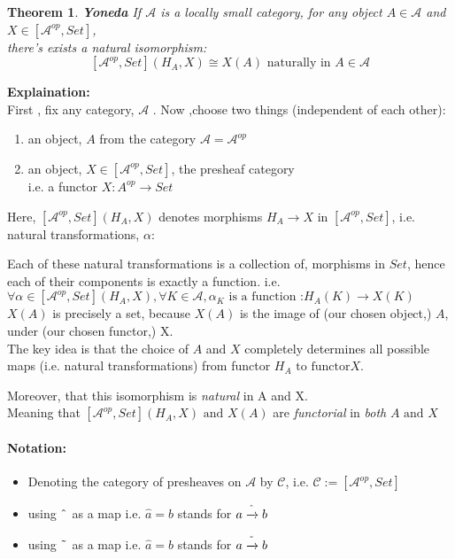 \documentclass[18pt,a4paper]{article}
\newtheorem{theorem}{Theorem}[section]
\theoremstyle{definition}
\begin{document}
\begin{theorem}{\textbf{Yoneda}} %
	If $\mathcal{A} $ is a locally small category, for any object $A \in \mathcal{A} $
	and $X \in [ \mathcal{A}^{op},Set]$,\\ there's exists a natural isomorphism:
	\[ [ \mathcal{A} ^{op},Set ](H_A,X) \cong X(A) \text{ naturally in } A \in \mathcal{A} \]
\end{theorem}
\textbf{Explaination:} \\
First , fix any category, $\mathcal{A} $ . Now ,choose two things (independent of each other):
\begin{enumerate}[label=\roman*]
	\item an object, $A$ from the category $ \mathcal{A}= \mathcal{A} ^{op} $
	\item an object, $X \in [ \mathcal{A}^{op},Set] $, the presheaf category \\
		i.e. a functor $X: A^{op} \rightarrow Set$
\end{enumerate}
Here, $[ \mathcal{A}^{op},Set](	H_A,X) $ denotes morphisms
$H_A \rightarrow X$ in $[ \mathcal{A}^{op},Set] $,
i.e. natural transformations, $\alpha :$
Each of these natural transformations is a collection of, morphisms in $Set$,
hence each of their components is exactly a function. i.e.
$\forall \alpha \in [ \mathcal{A}^{op},Set](H_A,X), \forall K \in \mathcal{A}, \alpha_K \text{ is a function :} H_A(K) \to X(K)$\\

$X(A)$ is precisely a set, because $X(A)$ is the image of (our chosen object,) $A$, under (our chosen functor,) X. \\

The key idea is that the choice of $A$ and $X$ completely determines all possible maps
(i.e. natural transformations) from functor $H_A \text{ to functor} X$.

Moreover, that this isomorphism is \textit{natural} in A and X. \\
Meaning that $[ \mathcal{A}^{op},Set](H_A,X) \text{ and } X(A)$ are
\textit{functorial} in \textit{both} $A \text{ and } X$

\paragraph{Notation:} \begin{itemize}
	\item Denoting the category of presheaves on $\mathcal{A} $ by $\mathcal{C}$,
		i.e. $\mathcal{C}:=[ \mathcal{A} ^{op}, Set] $
	\item using $\string ^ $ as a map i.e. $\hat a = b$ stands for $a \xrightarrow{\string ^} b$
	\item using $\string ~ $ as a map i.e. $\hat a = b$ stands for $a \xrightarrow{\string ~} b$
\end{itemize}
\end{document}
